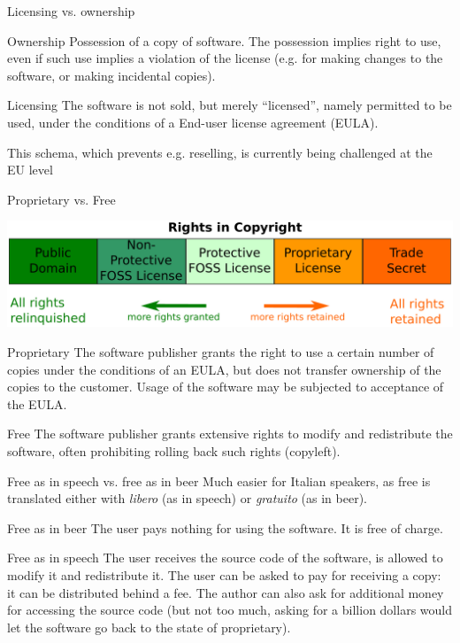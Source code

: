 \documentclass[presentation]{beamer}
\begin{document}
\begin{frame}{Licensing vs. ownership}
    \begin{block}{Ownership}
        Possession of a copy of software. The possession implies right to use, even if such use implies a violation of the license (e.g. for making changes to the software, or making incidental copies).
    \end{block}
    \begin{block}{Licensing}
        The software is not sold, but merely ``licensed'', namely permitted to be used, under the conditions of a End-user license agreement (EULA).
        
        This schema, which prevents e.g. reselling, is currently being challenged at the EU level
    \end{block}
\end{frame}

\begin{frame}{Proprietary vs. Free}
    \begin{center}
        \includegraphics[width=\textwidth]{rights}
    \end{center}
    \vspace{-10pt}
    \begin{block}{Proprietary}
        The software publisher grants the right to use a certain number of copies under the conditions of an EULA, but does not transfer ownership of the copies to the customer. Usage of the software may be subjected to acceptance of the EULA.
    \end{block}
    \begin{block}{Free}
        The software publisher grants extensive rights to modify and redistribute the software, often prohibiting rolling back such rights (copyleft).
    \end{block}
\end{frame}

\begin{frame}{Free as in speech vs. free as in beer}
    Much easier for Italian speakers, as free is translated either with \textit{libero} (as in speech) or \textit{gratuito} (as in beer).
    \begin{block}{Free as in beer}
        The user pays nothing for using the software. It is free of charge.
    \end{block}
    \begin{block}{Free as in speech}
        The user receives the source code of the software, is allowed to modify it and redistribute it. The user can be asked to pay for receiving a copy: it can be distributed behind a fee. The author can also ask for additional money for accessing the source code (but not too much, asking for a billion dollars would let the software go back to the state of proprietary).
    \end{block}
\end{frame}
\end{document}
